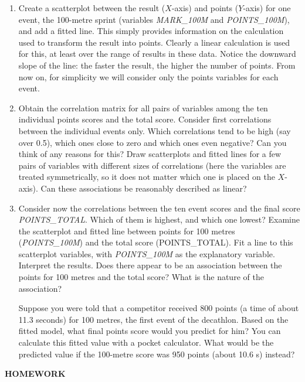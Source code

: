 \documentclass[11pt,a4paper,openany]{book}
\begin{document}
\begin{enumerate}
\def\labelenumi{\arabic{enumi}.}
\item
  Create a scatterplot between the result (\(X\)-axis) and points
  (\(Y\)-axis) for one event, the 100-metre sprint (variables
  \emph{MARK\_100M} and \emph{POINTS\_100M}), and add a fitted line.
  This simply provides information on the calculation used to transform
  the result into points. Clearly a linear calculation is used for this,
  at least over the range of results in these data. Notice the downward
  slope of the line: the faster the result, the higher the number of
  points. From now on, for simplicity we will consider only the points
  variables for each event.
\item
  Obtain the correlation matrix for all pairs of variables among the ten
  individual points scores and the total score. Consider first
  correlations between the individual events only. Which correlations
  tend to be high (say over 0.5), which ones close to zero and which
  ones even negative? Can you think of any reasons for this? Draw
  scatterplots and fitted lines for a few pairs of variables with
  different sizes of correlations (here the variables are treated
  symmetrically, so it does not matter which one is placed on the
  \(X\)-axis). Can these associations be reasonably described as linear?
\item
  Consider now the correlations between the ten event scores and the
  final score \emph{POINTS\_TOTAL}. Which of them is highest, and which
  one lowest? Examine the scatterplot and fitted line between points for
  100 metres (\emph{POINTS\_100M}) and the total score (POINTS\_TOTAL).
  Fit a line to this scatterplot variables, with \emph{POINTS\_100M} as
  the explanatory variable. Interpret the results. Does there appear to
  be an association between the points for 100 metres and the total
  score? What is the nature of the association?

  Suppose you were told that a competitor received 800 points (a time of
  about 11.3 seconds) for 100 metres, the first event of the decathlon.
  Based on the fitted model, what final points score would you predict
  for him? You can calculate this fitted value with a pocket calculator.
  What would be the predicted value if the 100-metre score was 950
  points (about 10.6 s) instead?
\end{enumerate}

\textbf{HOMEWORK}
\end{document}
